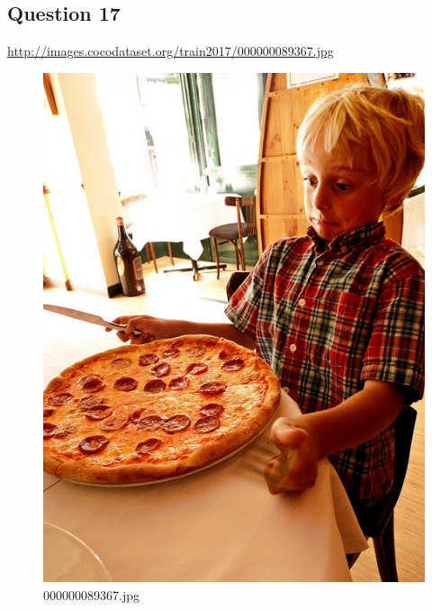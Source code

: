 \subsection*{Question 17}
\url{http://images.cocodataset.org/train2017/000000089367.jpg}
    \begin{figure}[h]
        \centering
        \includegraphics[width=0.8\linewidth]{../image set/easy/000000089367.jpg}
        \caption{000000089367.jpg}
    \end{figure}
